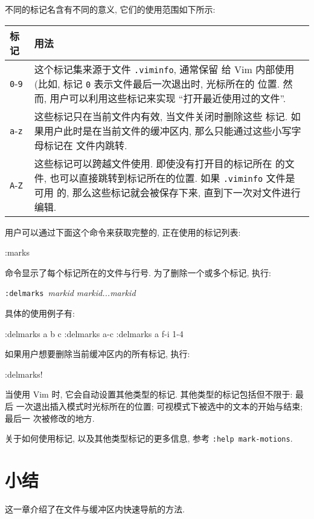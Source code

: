 \begin{vimcode}
不同的标记名含有不同的意义, 它们的使用范围如下所示:
\begin{center}
    \begin{tabular}{lp{40em}}
    \hline
    标记        & 用法 \\
    \hline
    \texttt{0}-\texttt{9} & 这个标记集来源于文件 \texttt{.viminfo}, 通常保留
    给 Vim 内部使用 (比如, 标记 \texttt{0} 表示文件最后一次退出时, 光标所在的
    位置. 然而, 用户可以利用这些标记来实现 ``打开最近使用过的文件''. \\
    \texttt{a}-\texttt{z} & 这些标记只在当前文件内有效, 当文件关闭时删除这些
    标记. 如果用户此时是在当前文件的缓冲区内, 那么只能通过这些小写字母标记在
    文件内跳转. \\
    \texttt{A}-\texttt{Z} & 这些标记可以跨越文件使用. 即使没有打开目的标记所在
    的文件, 也可以直接跳转到标记所在的位置. 如果 \texttt{.viminfo} 文件是可用
    的, 那么这些标记就会被保存下来, 直到下一次对文件进行编辑. \\
    \hline
\end{tabular}
\end{center}

用户可以通过下面这个命令来获取完整的, 正在使用的标记列表:
\begin{vimcode}
:marks
\end{vimcode}
命令显示了每个标记所在的文件与行号. 为了删除一个或多个标记, 执行:
\begin{vimcmdform}
\texttt{:delmarks}\ \textit{markid markid...markid}
\end{vimcmdform}
具体的使用例子有:
\begin{vimcode}
:delmarks a b c
:delmarks a-c
:delmarks a f-i 1-4
\end{vimcode}
如果用户想要删除当前缓冲区内的所有标记, 执行:
\begin{vimcode}
:delmarks!
\end{vimcode}

当使用 Vim 时, 它会自动设置其他类型的标记. 其他类型的标记包括但不限于: 最后
一次退出插入模式时光标所在的位置; 可视模式下被选中的文本的开始与结束; 最后一
次被修改的地方.

关于如何使用标记, 以及其他类型标记的更多信息, 参考 \texttt{:help mark-motions}.

\section{小结}
\label{sec:better_navigation_summary}

这一章介绍了在文件与缓冲区内快速导航的方法.


\end{vimcode}
